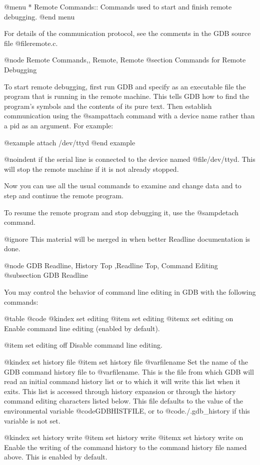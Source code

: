 @menu
* Remote Commands::       Commands used to start and finish remote debugging.
@end menu

For details of the communication protocol, see the comments in the GDB
source file @file{remote.c}.

@node Remote Commands,, Remote, Remote
@section Commands for Remote Debugging

To start remote debugging, first run GDB and specify as an executable file
the program that is running in the remote machine.  This tells GDB how
to find the program's symbols and the contents of its pure text.  Then
establish communication using the @samp{attach} command with a device
name rather than a pid as an argument.  For example:

@example
attach /dev/ttyd
@end example

@noindent
if the serial line is connected to the device named @file{/dev/ttyd}.  This
will stop the remote machine if it is not already stopped.

Now you can use all the usual commands to examine and change data and to
step and continue the remote program.

To resume the remote program and stop debugging it, use the @samp{detach}
command.

@ignore
This material will be merged in when better Readline documentation
is done.

@node GDB Readline, History Top ,Readline Top, Command Editing
@subsection GDB Readline

You may control the behavior of command line editing in GDB with the
following commands:

@table @code
@kindex set editing
@item set editing
@itemx set editing on
Enable command line editing (enabled by default).

@item set editing off
Disable command line editing.

@kindex set history file
@item set history file @var{filename}
Set the name of the GDB command history file to @var{filename}.  This is
the file from which GDB will read an initial command history
list or to which it will write this list when it exits.  This list is
accessed through history expansion or through the history
command editing characters listed below.  This file defaults to the
value of the environmental variable @code{GDBHISTFILE}, or to
@code{./.gdb_history} if this variable is not set.

@kindex set history write
@item set history write
@itemx set history write on
Enable the writing of the command history to the command history file
named above.  This is enabled by default.

